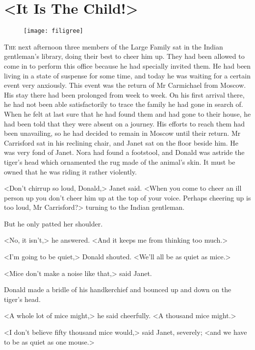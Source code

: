 \chapter{<It Is The Child!>}

\begin{figure}[t!]
\centering
\texttt{[image: filigree]}
\end{figure}

\lettrine[lines=5]{T}{he} next afternoon three members of the Large Family sat in the Indian gentleman's library, doing their best to cheer him up. They had been allowed to come in to perform this office because he had specially invited them. He had been living in a state of suspense for some time, and today he was waiting for a certain event very anxiously. This event was the return of Mr Carmichael from Moscow. His stay there had been prolonged from week to week. On his first arrival there, he had not been able satisfactorily to trace the family he had gone in search of. When he felt at last sure that he had found them and had gone to their house, he had been told that they were absent on a journey. His efforts to reach them had been unavailing, so he had decided to remain in Moscow until their return. Mr Carrisford sat in his reclining chair, and Janet sat on the floor beside him. He was very fond of Janet. Nora had found a footstool, and Donald was astride the tiger's head which ornamented the rug made of the animal's skin. It must be owned that he was riding it rather violently.

<Don't chirrup so loud, Donald,> Janet said. <When you come to cheer an ill person up you don't cheer him up at the top of your voice. Perhaps cheering up is too loud, Mr Carrisford?> turning to the Indian gentleman.

But he only patted her shoulder.

<No, it isn't,> he answered. <And it keeps me from thinking too much.>

<I'm going to be quiet,> Donald shouted. <We'll all be as quiet as mice.>

<Mice don't make a noise like that,> said Janet.

Donald made a bridle of his handkerchief and bounced up and down on the tiger's head.

<A whole lot of mice might,> he said cheerfully. <A thousand mice might.>

<I don't believe fifty thousand mice would,> said Janet, severely; <and we have to be as quiet as one mouse.>

